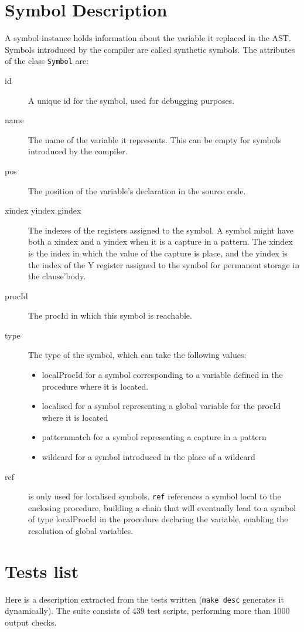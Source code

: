 \documentclass[a4paper]{memoir}
\begin{document}
\begin{appendices}
\begin{tabular} {p{4cm}p{4cm}p{5cm}}
\end{tabular}

\chapter{Symbol Description}\label{appendix:symbol}
A symbol instance holds information about the variable it replaced in the AST. Symbols introduced by the compiler are called synthetic symbols.
The attributes of the class \lstinline!Symbol! are:
\begin{description}
  \item[id] A unique id for the symbol, used for debugging purposes.
  \item[name] The name of the variable it represents. This can be empty for symbols introduced by the compiler.
  \item[pos] The position of the variable's declaration in the source code.
  \item[xindex yindex gindex] The indexes of the registers assigned to the symbol. A symbol might have both a xindex and a yindex when it is a capture in a pattern. The xindex is the index in which the value of the capture is place, and the yindex is the index of the Y register assigned to the symbol for permanent storage in the clause'body.
  \item[procId] The procId in which this symbol is reachable.
  \item[type] The type of the symbol, which can take the following values:
    \begin{itemize}
      \item localProcId for a symbol corresponding to a variable defined in the procedure where it is located.
      \item localised for a symbol representing a global variable for the procId where it is located
      \item patternmatch for a symbol representing a capture in a pattern
      \item wildcard for a symbol introduced in the place of a wildcard
    \end{itemize}
  \item[ref] is only used for localised symbols. \lstinline!ref! references a symbol local to the enclosing procedure, building a chain that will eventually lead to a symbol of type localProcId in the procedure declaring the variable, enabling the resolution of global variables.
\end{description}

\chapter{Tests list}
Here is a description extracted from the tests written (\lstinline!make desc!
generates it dynamically).
The suite consists of 439 test scripts, performing more than 1000 output
checks.


\end{appendices}
\end{document}
